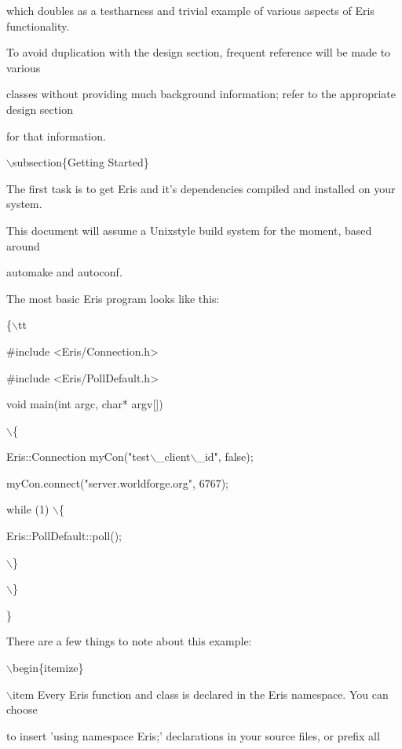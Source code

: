 \documentclass[12pt]{article}
\begin{document}
which doubles as a testharness and trivial example of various aspects of Eris functionality.



To avoid duplication with the design section, frequent reference will be made to various

classes without providing much background information; refer to the appropriate design section

for that information.



\ensuremath{\backslash}subsection\{Getting Started\}

The first task is to get Eris and it's dependencies compiled and installed on your system.

This document will assume a Unixstyle build system for the moment, based around

automake and autoconf.



The most basic Eris program looks like this:

\{\ensuremath{\backslash}tt



\#include <Eris/Connection.h>

\#include <Eris/PollDefault.h>



void main(int argc, char* argv[])

\ensuremath{\backslash}\{

    Eris::Connection myCon("test\ensuremath{\backslash}\_client\ensuremath{\backslash}\_id", false);

    

    myCon.connect("server.worldforge.org", 6767);

    

    while (1) \ensuremath{\backslash}\{

	Eris::PollDefault::poll();

    \ensuremath{\backslash}\}

\ensuremath{\backslash}\}

\}



There are a few things to note about this example:

\ensuremath{\backslash}begin\{itemize\}

\ensuremath{\backslash}item Every Eris function and class is declared in the Eris namespace. You can choose

to insert 'using namespace Eris;' declarations in your source files, or prefix all
\end{document}
